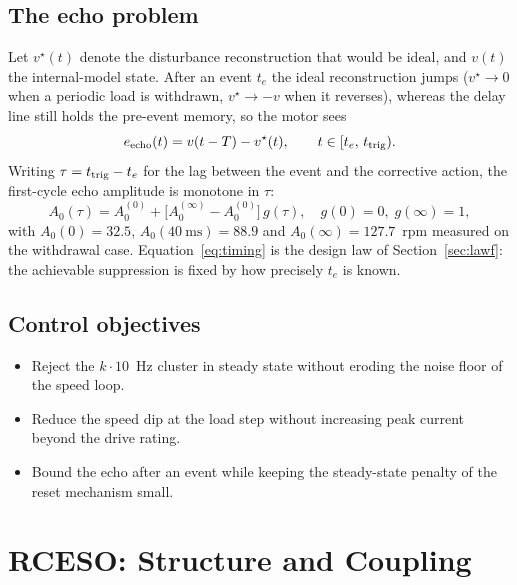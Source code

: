 \documentclass[journal]{IEEEtran}
\theoremstyle{remark}
\begin{document}
\subsection{The echo problem}
Let $v^\star(t)$ denote the disturbance reconstruction that would be ideal, and $v(t)$
the internal-model state. After an event $t_e$ the ideal reconstruction jumps
($v^\star\to0$ when a periodic load is withdrawn, $v^\star\to-v$ when it reverses),
whereas the delay line still holds the pre-event memory, so the motor sees
\begin{equation}
e_{\rm echo}(t)=v(t-T)-v^\star(t),\qquad t\in[t_e,\,t_{\rm trig}) .
\label{eq:echo}
\end{equation}
Writing $\tau=t_{\rm trig}-t_e$ for the lag between the event and the corrective
action, the first-cycle echo amplitude is monotone in $\tau$:
\begin{equation}
A_0(\tau)=A_0^{(0)}+\big[A_0^{(\infty)}-A_0^{(0)}\big]\,g(\tau),\quad g(0)=0,\; g(\infty)=1,
\label{eq:timing}
\end{equation}
with $A_0(0)=32.5$, $A_0(40~\mathrm{ms})=88.9$ and $A_0(\infty)=127.7$~rpm measured
on the withdrawal case. Equation~\eqref{eq:timing} is the design law of
Section~\ref{sec:lawf}: the achievable suppression is fixed by how precisely $t_e$
is known.

\subsection{Control objectives}
\begin{itemize}
\item[R1] Reject the $k\cdot 10$~Hz cluster in steady state without eroding the noise
floor of the speed loop.
\item[R2] Reduce the speed dip at the load step without increasing peak current
beyond the drive rating.
\item[R3] Bound the echo after an event while keeping the steady-state penalty of the
reset mechanism small.
\end{itemize}

\section{RCESO: Structure and Coupling}\label{sec:rceso}
\end{document}
